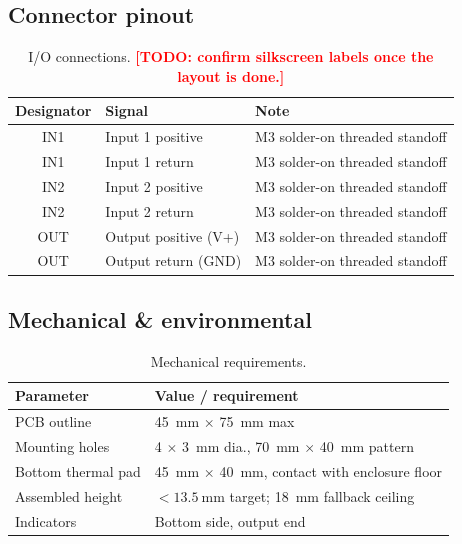 \documentclass[11pt,a4paper]{article}
\newcommand{\todo}[1]{\textcolor{red}{\textbf{[TODO: #1]}}}
\begin{document}
\subsection{Connector pinout}
\begin{table}[H]
  \centering
  \begin{tabular}{@{}cll@{}}
    \toprule
    \textbf{Designator} & \textbf{Signal} & \textbf{Note} \\
    \midrule
    IN1 & Input 1 positive & M3 solder-on threaded standoff \\
    IN1 & Input 1 return   & M3 solder-on threaded standoff \\
    IN2 & Input 2 positive & M3 solder-on threaded standoff \\
    IN2 & Input 2 return   & M3 solder-on threaded standoff \\
    OUT & Output positive (V+) & M3 solder-on threaded standoff \\
    OUT & Output return (GND)  & M3 solder-on threaded standoff \\
    \bottomrule
  \end{tabular}
  \caption{I/O connections. \todo{confirm silkscreen labels once the layout is done.}}
\end{table}

\subsection{Mechanical \& environmental}
\begin{table}[H]
  \centering
  \begin{tabularx}{\linewidth}{@{}lX@{}}
    \toprule
    \textbf{Parameter} & \textbf{Value / requirement} \\
    \midrule
    PCB outline            & \SI{45}{\mm} $\times$ \SI{75}{\mm} max \\
    Mounting holes         & 4 $\times$ \SI{3}{\mm} dia., \SI{70}{\mm} $\times$ \SI{40}{\mm} pattern \\
    Bottom thermal pad     & \SI{45}{\mm} $\times$ \SI{40}{\mm}, contact with enclosure floor \\
    Assembled height       & $<\SI{13.5}{\mm}$ target; \SI{18}{\mm} fallback ceiling \\
    Indicators             & Bottom side, output end \\
    \bottomrule
  \end{tabularx}
  \caption{Mechanical requirements.}
\end{table}
\end{document}
